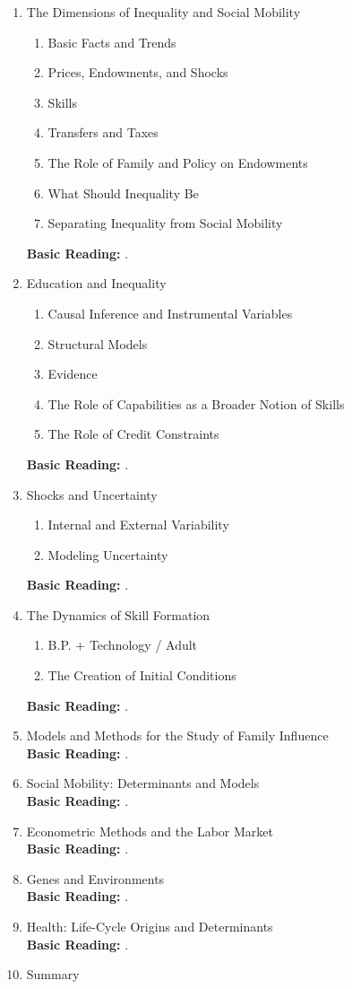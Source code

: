 \documentclass[12pt]{article}
\begin{document}
\begin{enumerate}
\item The Dimensions of Inequality and Social Mobility
\begin{enumerate}
\item Basic Facts and Trends
\item Prices, Endowments, and Shocks
\item Skills
\item Transfers and Taxes
\item The Role of Family and Policy on Endowments
\item What Should Inequality Be
\item Separating Inequality from Social Mobility
\end{enumerate}
\textbf{Basic Reading:} \citet{oecd2011divided}.
\item Education and Inequality
\begin{enumerate}
\item Causal Inference and Instrumental Variables
\item Structural Models
\item Evidence
\item The Role of Capabilities as a Broader Notion of Skills
\item The Role of Credit Constraints
\end{enumerate}
\textbf{Basic Reading:} \citet{heckman2006earnings}.
\item Shocks and Uncertainty
\begin{enumerate}
\item Internal and External Variability
\item Modeling Uncertainty
\end{enumerate}
\textbf{Basic Reading:} \citet{meghir2011earnings}.
\item The Dynamics of Skill Formation
\begin{enumerate}
\item B.P. + Technology / Adult
\item The Creation of Initial Conditions
\end{enumerate}
\textbf{Basic Reading:} \citet{acemoglu2011skills}.
\item Models and Methods for the Study of Family Influence\\
\textbf{Basic Reading:} \citet{Bjorklund2011education,raquel2010culture}.
\item Social Mobility: Determinants and Models\\
\textbf{Basic Reading:} \citet{black2011recent}.
\item Econometric Methods and the Labor Market\\
\textbf{Basic Reading:} \citet{french2011identification}.
\item Genes and Environments\\
\textbf{Basic Reading:} \citet{sacerdote2010nature,almlund2011perso}.
\item Health: Life-Cycle Origins and Determinants\\
\textbf{Basic Reading:} \citet{cawley2011health}.
\item Summary
\end{enumerate}



\end{document}
